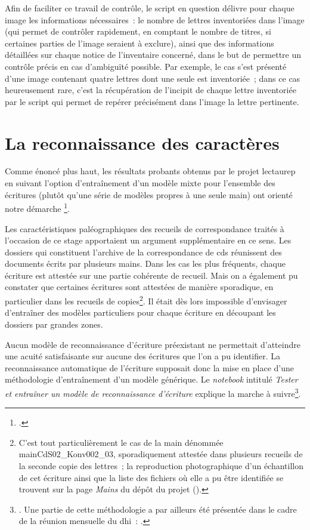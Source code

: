 \documentclass[a4paper,12pt,twoside]{book}
\begin{document}
	    		Afin de faciliter ce travail de contrôle, le script en question délivre pour chaque image les informations nécessaires~: le nombre de lettres inventoriées dans l'image (qui permet de contrôler rapidement, en comptant le nombre de titres, si certaines parties de l'image seraient à exclure), ainsi que des informations détaillées sur chaque notice de l'inventaire concerné, dans le but de permettre un contrôle précis en cas d'ambiguïté possible. Par exemple, le cas s'est présenté d'une image contenant quatre lettres dont une seule est inventoriée~; dans ce cas heureusement rare, c'est la récupération de l'incipit de chaque lettre inventoriée par le script qui permet de repérer précisément dans l'image la lettre pertinente.
				
		\section{La reconnaissance des caractères}
			Comme énoncé plus haut, les résultats probants obtenus par le projet \gls{lectaurep} en suivant l'option d'entraînement d'un modèle mixte pour l'ensemble des écritures (plutôt qu'une série de modèles propres à une seule main) ont orienté notre démarche
			\footcite{chagueCreationModelesTranscriptiona}.
			
			Les caractéristiques paléographiques des recueils de correspondance traités à l'occasion de ce stage apportaient un argument supplémentaire en ce sens. Les dossiers qui constituent l'archive de la correspondance de \gls{cds} réunissent des documents écrits par plusieurs mains. Dans les cas les plus fréquents, chaque écriture est attestée sur une partie cohérente de recueil. Mais on a également pu constater que certaines écritures sont attestées de manière sporadique, en particulier dans les recueils de copies\footnote{C'est tout particulièrement le cas de la main dénommée mainCdS02\_Konv002\_03, sporadiquement attestée dans plusieurs recueils de la seconde copie des lettres~; la reproduction photographique d'un échantillon de cet écriture ainsi que la liste des fichiers où elle a pu être identifiée se trouvent sur la page \textit{Mains} du dépôt du projet (\cite{biayMains2022}).}. Il était dès lors impossible d'envisager d'entraîner des modèles particuliers pour chaque écriture en découpant les dossiers par grandes zones.
			
			Aucun modèle de reconnaissance d'écriture préexistant ne permettait d'atteindre une acuité satisfaisante sur aucune des écritures que l'on a pu identifier. La reconnaissance automatique de l'écriture supposait donc la mise en place d'une méthodologie d'entraînement d'un modèle générique. Le \textit{notebook} intitulé \textit{Tester et entraîner un modèle de reconnaissance d'écriture} explique la marche à suivre\footnote{\cite{biayTesterEntrainerModele2022}. 
			Une partie de cette méthodologie a par ailleurs été présentée dans le cadre de la réunion mensuelle du \gls{dhi}~: \cite{biayIntelligenceArtificelleIHA2022}.}.
			
\end{document}
